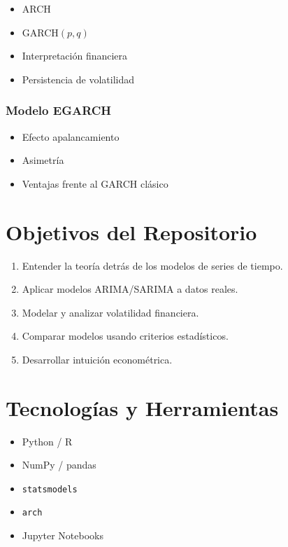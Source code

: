 \documentclass[12pt, a4paper]{article}
\begin{document}
\begin{itemize}
  \item ARCH
  \item GARCH$(p,q)$
  \item Interpretación financiera
  \item Persistencia de volatilidad
\end{itemize}

\subsubsection{Modelo EGARCH}

\begin{itemize}
  \item Efecto apalancamiento
  \item Asimetría
  \item Ventajas frente al GARCH clásico
\end{itemize}

\section{Objetivos del Repositorio}

\begin{enumerate}
  \item Entender la teoría detrás de los modelos de series de tiempo.
  \item Aplicar modelos ARIMA/SARIMA a datos reales.
  \item Modelar y analizar volatilidad financiera.
  \item Comparar modelos usando criterios estadísticos.
  \item Desarrollar intuición econométrica.
\end{enumerate}

\section{Tecnologías y Herramientas}

\begin{itemize}
  \item Python / R
  \item NumPy / pandas
  \item \texttt{statsmodels}
  \item \texttt{arch}
  \item Jupyter Notebooks
\end{itemize}
\end{document}
